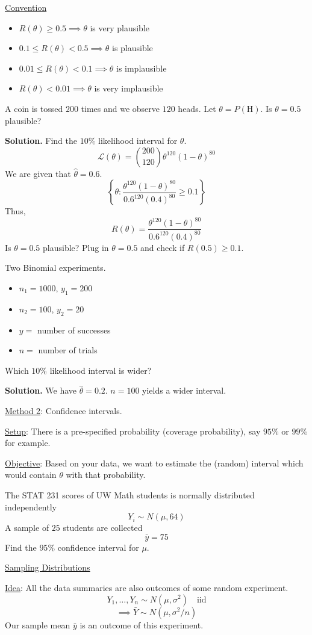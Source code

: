 \underline{Convention}
\begin{itemize}
    \item $ R(\theta)\geqslant 0.5\implies \theta $ is very plausible
    \item $ 0.1\leqslant R(\theta)<0.5\implies \theta $ is plausible
    \item $ 0.01\leqslant R(\theta)<0.1\implies \theta $ is implausible
    \item $ R(\theta)<0.01\implies \theta $ is very implausible
\end{itemize}

\begin{Example}{}{}
    A coin is tossed $ 200 $ times and we observe $ 120 $ heads.
    Let $ \theta=P(\text{H}) $. Is $ \theta=0.5 $ plausible?

    \textbf{Solution.} Find the $ 10\% $ likelihood interval for $ \theta $.
    \[ \mathcal{L}(\theta)=\binom{200}{120}\theta^{120}(1-\theta)^{80} \]
    We are given that $ \hat{\theta}=0.6 $.
    \[ \left\{ \theta:\frac{\theta^{120}(1-\theta)^{80}}{0.6^{120}(0.4)^{80}}\geqslant 0.1 \right\} \]
    Thus,
    \[ R(\theta)=\frac{\theta^{120}(1-\theta)^{80}}{0.6^{120}(0.4)^{80}} \]
    Is $ \theta=0.5 $ plausible? Plug in $ \theta=0.5 $ and check if $ R(0.5)\geqslant 0.1 $.
\end{Example}


\begin{Example}{}{}
    Two Binomial experiments.
    \begin{itemize}
        \item $ n_1=1000 $, $ y_1=200 $
        \item $ n_2=100 $, $ y_2=20 $
        \item $ y= $ number of successes
        \item $ n= $ number of trials
    \end{itemize}
    Which $ 10\% $ likelihood interval is wider?

    \textbf{Solution.} We have $ \hat{\theta}=0.2 $.
    $ n=100 $ yields a wider interval.
\end{Example}


\underline{Method 2}: Confidence intervals.

\underline{Setup}: There is a pre-specified probability (coverage probability),
say $ 95\% $ or $ 99\% $ for example.

\underline{Objective}: Based on your data, we want to estimate the (random)
interval which would contain $ \theta $ with that probability.

\begin{Example}{}{}
    The STAT 231 scores of UW Math students is normally distributed independently
    \[ Y_i \sim N(\mu,64) \]
    A sample of $ 25 $ students are collected
    \[ \bar{y}=75 \]
    Find the $ 95\% $ confidence interval for $ \mu $.
\end{Example}

\underline{Sampling Distributions}

\underline{Idea}: All the data summaries are also outcomes of some random experiment.
\[ Y_1,\ldots ,Y_n \sim N(\mu,\sigma^2) \quad\text{iid}\]
\[ \implies \bar{Y} \sim N(\mu,\sigma^2/n) \]
Our sample mean $ \bar{y} $ is an outcome of this experiment.
